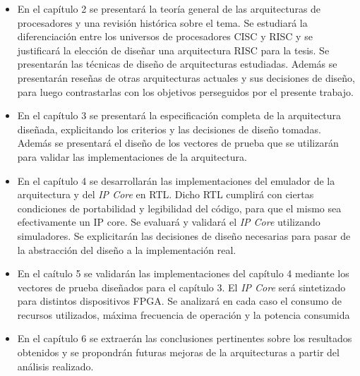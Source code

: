\begin{itemize}
\item En el capítulo 2 se presentará la teoría general de las arquitecturas de procesadores y una revisión histórica sobre el tema. Se estudiará la diferenciación entre los universos de procesadores CISC y RISC y se justificará la elección de diseñar una arquitectura RISC para la tesis. Se presentarán las técnicas de diseño de arquitecturas estudiadas. Además se presentarán reseñas de otras arquitecturas actuales y sus decisiones de diseño, para luego contrastarlas con los objetivos perseguidos por el presente trabajo.
\item En el capítulo 3 se presentará la especificación completa de la arquitectura diseñada, explicitando los criterios y las decisiones de diseño tomadas. Además se presentará el diseño de los vectores de prueba que se utilizarán para validar las implementaciones de la arquitectura.
\item En el capítulo 4 se desarrollarán las implementaciones del emulador de la arquitectura y del \emph{IP Core} en RTL. Dicho RTL cumplirá con ciertas condiciones de portabilidad y legibilidad del código, para que el mismo sea efectivamente un IP core. Se evaluará y validará el \emph{IP Core} utilizando simuladores. Se explicitarán las decisiones de diseño necesarias para pasar de la abstracción del diseño a la implementación real.
\item En el caítulo 5 se validarán las implementaciones del capítulo 4 mediante los vectores de prueba diseñados para el capítulo 3. El \emph{IP Core} será sintetizado para distintos dispositivos FPGA. Se analizará en cada caso el consumo de recursos utilizados, máxima frecuencia de operación y la potencia consumida
\item En el capítulo 6 se extraerán las conclusiones pertinentes sobre los resultados obtenidos y se propondrán futuras mejoras de la arquitecturas a partir del análisis realizado.
\end{itemize}
